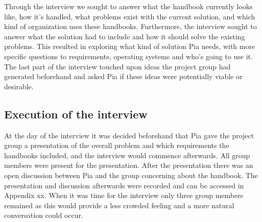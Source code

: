 Through the interview we sought to answer what the handbook currently looks like, how it’s handled, what problems exist with the current solution, and which kind of organization uses these handbooks. Furthermore, the interview sought to answer what the solution had to include and how it should solve the existing problems. This resulted in exploring what kind of solution Pia needs, with more specific questions to requirements, operating systems and who’s going to use it. The last part of the interview touched upon ideas the project group had generated beforehand and asked Pia if these ideas were potentially viable or desirable.

\subsection{Execution of the interview}

At the day of the interview it was decided beforehand that Pia gave the project group a presentation of the overall problem and which requirements the handbooks included, and the interview would commence afterwards. All group members were present for the presentation. After the presentation there was an open discussion between Pia and the group concerning about the handbook. The presentation and discussion afterwards were recorded and can be accessed in Appendix xx. When it was time for the interview only three group members remained as this would provide a less crowded feeling and a more natural conversation could occur.
